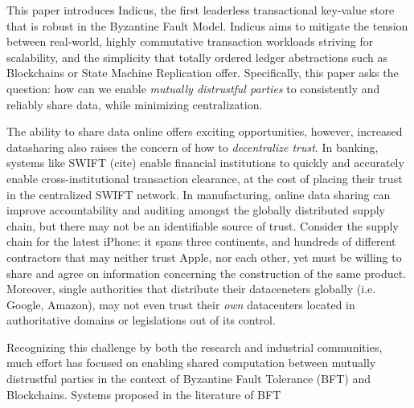 


This paper introduces Indicus, the first leaderless transactional key-value store that is robust in the Byzantine Fault Model. Indicus aims to mitigate the tension between real-world, highly commutative transaction workloads striving for scalability, and the simplicity that totally ordered ledger abstractions such as Blockchains or State Machine Replication offer. Specifically, this paper asks the question: how can we enable \textit{mutually distrustful parties} to consistently and reliably share data, while minimizing centralization. 

The ability to share data online offers exciting opportunities, however, increased datasharing also raises the concern of how to \textit{decentralize trust}. In banking, systems like SWIFT (cite) enable financial institutions to quickly and accurately enable cross-institutional transaction clearance, at the cost of placing their trust in the centralized SWIFT network. In manufacturing, online data sharing can improve accountability and auditing amongst the globally distributed supply chain, but there may not be an identifiable source of trust. Consider the supply chain for the latest iPhone: it spans three continents, and hundreds of different contractors \cite{AppleSup} that may neither trust Apple, nor each other, yet must be willing to share and agree on information concerning the construction of the same product. Moreover, single authorities that distribute their dataceneters globally (i.e. Google, Amazon), may not even trust their \textit{own} datacenters located in authoritative domains or legislations out of its control.

Recognizing this challenge by both the research and industrial communities, much effort has focused on enabling shared computation between mutually distrustful parties in the context of Byzantine Fault Tolerance (BFT) and Blockchains. Systems proposed in the literature of BFT 
